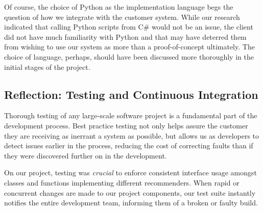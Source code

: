 \documentclass{l3proj}
\begin{document}
Of course, the choice of Python as the implementation language begs the question of how we integrate with the customer system. While our research indicated that calling Python scripts from C\# would not be an issue, the client did not have much familiarity with Python and that may have deterred them from wishing to use our system as more than a proof-of-concept ultimately. The choice of language, perhaps, should have been discussed more thoroughly in the initial stages of the project.

\subsection{Reflection: Testing and Continuous Integration}
\label{sec:testing}
% 




Thorough testing of any large-scale software project is a fundamental part of the development process. Best practice testing not only helps assure the customer they are receiving as inerrant a system as possible, but allows us as developers to detect issues earlier in the process, reducing the cost of correcting faults than if they were discovered further on in the development. 

On our project, testing was \textit{crucial} to enforce consistent interface usage amongst classes and functions implementing different recommenders. When rapid or concurrent changes are made to our project components, our test suite instantly notifies the entire development team, informing them of a broken or faulty build.
\end{document}
